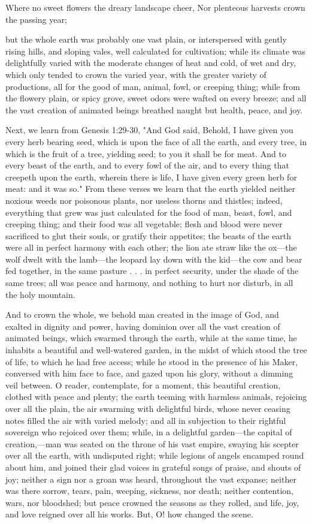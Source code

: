 Where no sweet flowers the dreary landscape cheer, Nor plenteous harvests crown the
passing year;

but the whole earth was probably one vast plain, or interspersed with gently rising hills, and
sloping vales, well calculated for cultivation; while its climate was delightfully varied with
the moderate changes of heat and cold, of wet and dry, which only tended to crown the
varied year, with the greater variety of productions, all for the good of man, animal, fowl, or
creeping thing; while from the flowery plain, or spicy grove, sweet odors were wafted on
every breeze; and all the vast creation of animated beings breathed naught but health, peace,
and joy.

Next, we learn from Genesis 1:29-30, "And God said, Behold, I have given you every herb
bearing seed, which is upon the face of all the earth, and every tree, in which is the fruit of a
tree, yielding seed; to you it shall be for meat. And to every beast of the earth, and to every
fowl of the air, and to every thing that creepeth upon the earth, wherein there is life, I have
given every green herb for meat: and it was so." From these verses we learn that the earth
yielded neither noxious weeds nor poisonous plants, nor useless thorns and thistles; indeed,
everything that grew was just calculated for the food of man, beast, fowl, and creeping thing;
and their food was all vegetable; flesh and blood were never sacrificed to glut their souls, or
gratify their appetites; the beasts of the earth were all in perfect harmony with each other; the
lion ate straw like the ox—the wolf dwelt with the lamb—the leopard lay down with the
kid—the cow and bear fed together, in the same pasture . . . in perfect security, under the
shade of the same trees; all was peace and harmony, and nothing to hurt nor disturb, in all the
holy mountain.

And to crown the whole, we behold man created in the image of God, and exalted in dignity
and power, having dominion over all the vast creation of animated beings, which swarmed
through the earth, while at the same time, he inhabits a beautiful and well-watered garden, in
the midst of which stood the tree of life, to which he had free access; while he stood in the
presence of his Maker, conversed with him face to face, and gazed upon his glory, without a
dimming veil between. O reader, contemplate, for a moment, this beautiful creation, clothed
with peace and plenty; the earth teeming with harmless animals, rejoicing over all the plain,
the air swarming with delightful birds, whose never ceasing notes filled the air with varied
melody; and all in subjection to their rightful sovereign who rejoiced over them; while, in a
delightful garden—the capital of creation,—man was seated on the throne of his vast empire,
swaying his scepter over all the earth, with undisputed right; while legions of angels
encamped round about him, and joined their glad voices in grateful songs of praise, and
shouts of joy; neither a sign nor a groan was heard, throughout the vast expanse; neither was
there sorrow, tears, pain, weeping, sickness, nor death; neither contention, wars, nor
bloodshed; but peace crowned the seasons as they rolled, and life, joy, and love reigned over
all his works. But, O! how changed the scene.

